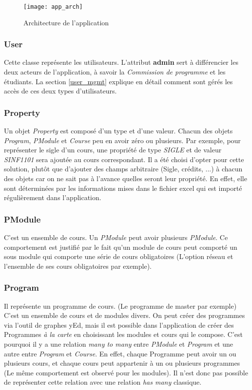 \label{arch}
\begin{figure}
\centering
\caption{Architecture de l'application}
\label{fig:app_arch}
\texttt{[image: app\_arch]}
\end{figure}

\subsubsection{User} 

Cette classe représente les utilisateurs.  L'attribut \textbf{admin} sert à différencier les deux acteurs de l'application, à savoir la \textit{Commission de programme} et les étudiants. La section \ref{user_mgmt}
 explique en détail comment sont gérés les accès de ces deux types d'utilisateurs.

\subsubsection{Property}

Un objet \textit{Property} est composé d'un type et d'une valeur. Chacun des objets \textit{Program}, \textit{PModule} et \textit{Course} peu en avoir zéro ou plusieurs. Par exemple, pour représenter le sigle d'un cours, une propriété de type \textit{SIGLE} et de valeur \textit{SINF1101} sera ajoutée au cours correspondant. Il a été choisi d'opter pour cette solution, plutôt que d'ajouter des champs arbitraire (Sigle, crédits, ...) à chacun des objets car on ne sait pas à l'avance quelles seront leur propriété. En effet, elle sont déterminées par les informations mises dans le fichier excel qui est importé régulièrement dans l'application. 

\subsubsection{PModule}

C'est un ensemble de cours. Un \textit{PModule} peut avoir plusieurs \textit{PModule}. Ce comportement est justifié par le fait qu'un module de cours peut comporté un sous module qui comporte une série de cours obligatoires (L'option réseau et l'ensemble de ses cours obligatoires par exemple).

\subsubsection{Program}

Il représente un programme de cours. (Le programme de master par exemple) C'est un ensemble de cours et de modules divers. On peut créer des programmes via l'outil de graphes yEd, mais il est possible dans l'application de créer des Programmes \textit{à la carte} en choisissant les modules et cours qui le compose. C'est pourquoi il y a une relation \textit{many to many} entre \textit{PModule} et \textit{Program} et une autre entre \textit{Program} et \textit{Course}. En effet, chaque Programme peut avoir un ou plusieurs cours, et chaque cours peut appartenir à un ou plusieurs programmes (Le même comportement est observé pour les modules). Il n'est donc pas possible de représenter cette relation avec une relation \textit{has many} classique.

